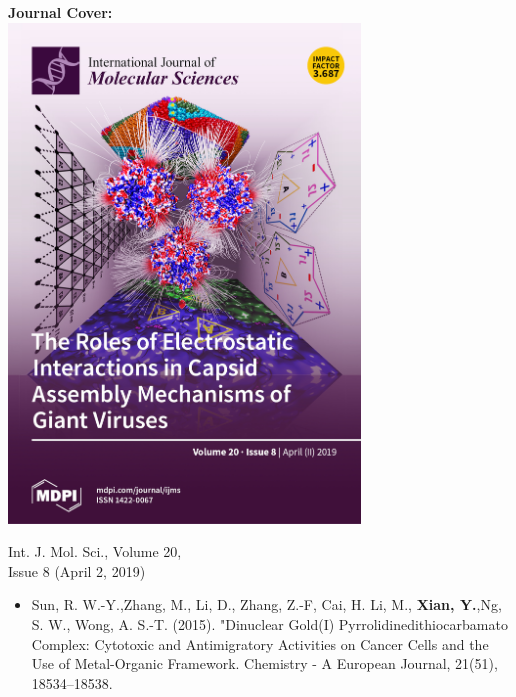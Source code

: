 \begin{minipage}[t]{.3\textwidth}
    \centering
    \textbf{Journal Cover:}\\
    \href{https://www.mdpi.com/1422-0067/20/8}{\includegraphics[width=0.7\textwidth]{IJMS-Cover.jpg}}

    Int. J. Mol. Sci., Volume 20, \\ Issue 8 (April 2, 2019)
\end{minipage}


\begin{itemize}
    \item Sun, R. W.-Y.,Zhang, M., Li, D., Zhang, Z.-F, Cai, H. Li, M., \textbf{Xian, Y.},Ng, S. W., Wong, A. S.-T. (2015). "Dinuclear Gold(I) Pyrrolidinedithiocarbamato Complex: Cytotoxic and Antimigratory Activities on Cancer Cells and the Use of Metal-Organic Framework. Chemistry - A European Journal, 21(51), 18534–18538. 
\end{itemize}